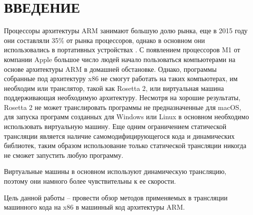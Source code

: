 \section*{ВВЕДЕНИЕ}

Процессоры архитектуры ARM занимают большую долю рынка, еще в 2015 году они составляли 35\% от рынка процессоров, однако в основном они использовались в портативных устройствах \cite{arm_report}.  С появлением процессоров M1 от компании Apple большое число людей начало пользоваться компьютерами на основе архитектуры ARM в домашней обстановке. Однако, программы собранные под архитектуру x86 не смогут работать на таких компьютерах, им необходим или транслятор, такой как Rosetta 2, или виртуальная машина поддерживающая необходимую архитектуру. Несмотря на хорошие результаты, Rosetta 2 не может транслировать программы не предназначенные для macOS, для запуска программ созданных для Windows или Linux в основном необходимо использовать виртуальную машину. Еще одним ограничением статической трансляции является наличие самомодифицирующегося кода и динамических библиотек, таким образом использование только статической трансляции никогда не сможет запустить любую программу. \cite{fast_bin}

Виртуальные машины в основном используют динамическую трансляцию, поэтому они намного более чувствительны к ее скорости.

Цель данной работы – провести обзор методов применяемых в трансляции машинного кода на x86 в машинный код архитектуры ARM.

\pagebreak
